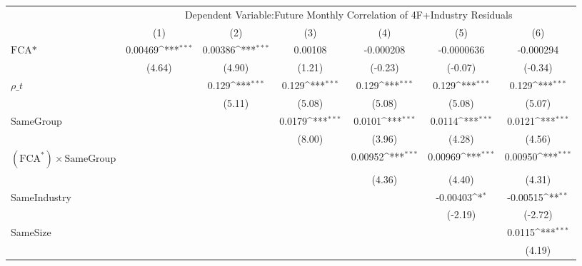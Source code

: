 {
\def\sym#1{\ifmmode^{#1}\else\(^{#1}\)\fi}
\begin{tabular}{l*{6}{c}}
\hline\hline
                &\multicolumn{6}{c}{Dependent Variable:Future Monthly Correlation of 4F+Industry Residuals}                       \\\cmidrule(lr){2-7}
                &\multicolumn{1}{c}{(1)}         &\multicolumn{1}{c}{(2)}         &\multicolumn{1}{c}{(3)}         &\multicolumn{1}{c}{(4)}         &\multicolumn{1}{c}{(5)}         &\multicolumn{1}{c}{(6)}         \\
\hline
$ \text{FCA*} $ &  0.00469\sym{***}&  0.00386\sym{***}&  0.00108         &-0.000208         &-0.0000636         &-0.000294         \\
                &   (4.64)         &   (4.90)         &   (1.21)         &  (-0.23)         &  (-0.07)         &  (-0.34)         \\
[1em]
 $ {\rho\_t} $   &                  &    0.129\sym{***}&    0.129\sym{***}&    0.129\sym{***}&    0.129\sym{***}&    0.129\sym{***}\\
                &                  &   (5.11)         &   (5.08)         &   (5.08)         &   (5.08)         &   (5.07)         \\
[1em]
SameGroup       &                  &                  &   0.0179\sym{***}&   0.0101\sym{***}&   0.0114\sym{***}&   0.0121\sym{***}\\
                &                  &                  &   (8.00)         &   (3.96)         &   (4.28)         &   (4.56)         \\
[1em]
 $ (\text{FCA}^*) \times {\text{SameGroup} }  $ &                  &                  &                  &  0.00952\sym{***}&  0.00969\sym{***}&  0.00950\sym{***}\\
                &                  &                  &                  &   (4.36)         &   (4.40)         &   (4.31)         \\
[1em]
SameIndustry    &                  &                  &                  &                  & -0.00403\sym{*}  & -0.00515\sym{**} \\
                &                  &                  &                  &                  &  (-2.19)         &  (-2.72)         \\
[1em]
SameSize        &                  &                  &                  &                  &                  &   0.0115\sym{***}\\
                &                  &                  &                  &                  &                  &   (4.19)         \\

\end{tabular}}
